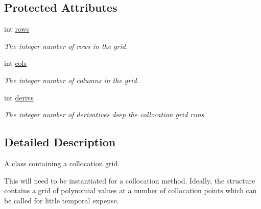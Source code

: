 \subsection*{Protected Attributes}
\begin{DoxyCompactItemize}
\item 
\hypertarget{classbases_1_1collocation__grid_adcf647eb455d150b3c7c4c34bb33b1ae}{int \hyperlink{classbases_1_1collocation__grid_adcf647eb455d150b3c7c4c34bb33b1ae}{rows}}\label{classbases_1_1collocation__grid_adcf647eb455d150b3c7c4c34bb33b1ae}

\begin{DoxyCompactList}\small\item\em The integer number of rows in the grid. \end{DoxyCompactList}\item 
\hypertarget{classbases_1_1collocation__grid_ac42def515322bb14f572ef564d7101d8}{int \hyperlink{classbases_1_1collocation__grid_ac42def515322bb14f572ef564d7101d8}{cols}}\label{classbases_1_1collocation__grid_ac42def515322bb14f572ef564d7101d8}

\begin{DoxyCompactList}\small\item\em The integer number of columns in the grid. \end{DoxyCompactList}\item 
\hypertarget{classbases_1_1collocation__grid_a696572e39da7ee8ab64f3300db8b0408}{int \hyperlink{classbases_1_1collocation__grid_a696572e39da7ee8ab64f3300db8b0408}{derivs}}\label{classbases_1_1collocation__grid_a696572e39da7ee8ab64f3300db8b0408}

\begin{DoxyCompactList}\small\item\em The integer number of derivatives deep the collocation grid runs. \end{DoxyCompactList}\end{DoxyCompactItemize}


\subsection{Detailed Description}
A class containing a collocation grid. 



 This will need to be instantiated for a collocation method. Ideally, the structure contains a grid of polynomial values at a number of collocation points which can be called for little temporal expense. 

